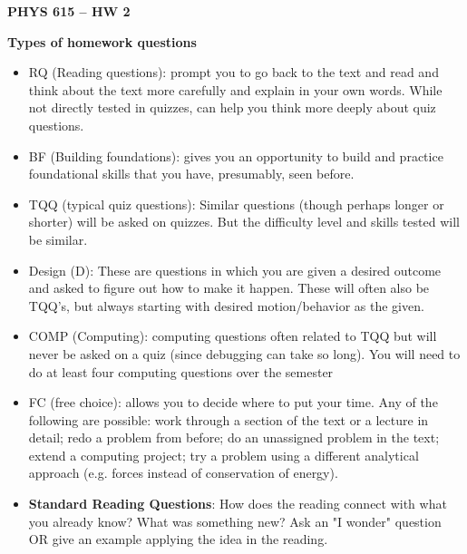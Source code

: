 \documentclass[12pt]{article}
\newcommand{\shortlist}{%
\parindent 0in%
\parskip   0in%
\itemsep   0in%
\topsep    0in%
\parsep    0in%
}
\newcommand{\Title}{PHYS 615 -- HW 2}
\begin{document}
\begin{center}
{\Large\bfseries\Title}

\end{center}
\bigskip
\bigskip


\textbf{Types of homework questions}
\begin{itemize}\shortlist
\item	RQ (Reading questions):  prompt you to go back to the text and read and think about the text more carefully and explain in your own words. While not directly tested in quizzes, can help you think more deeply about quiz questions.
\item	BF (Building foundations):  gives you an opportunity to build and practice foundational skills that you have, presumably, seen before.
\item	TQQ (typical quiz questions):   Similar questions (though perhaps longer or shorter) will be asked on quizzes.  But the difficulty level and skills tested will be similar.
\item Design (D):  These are questions in which you are given a desired outcome and asked to figure out how to make it happen.  These will often also be TQQ’s, but always starting with desired motion/behavior as the given.
\item	COMP (Computing): computing questions often related to TQQ but will never be asked on a quiz (since debugging can take so long).  You will need to do at least four computing questions over the semester
\item	FC (free choice): allows you to decide where to put your time.  Any of the following are possible:  work through a section of the text or a lecture in detail; redo a problem from before; do an unassigned problem in the text; extend a computing project; try a problem using a different analytical approach (e.g. forces instead of conservation of energy).
\item \textbf{Standard Reading Questions}: How does the reading connect with what you already know? What was something new?  Ask an "I wonder" question OR give an example applying the idea in the reading.
\end{itemize}
\end{document}
